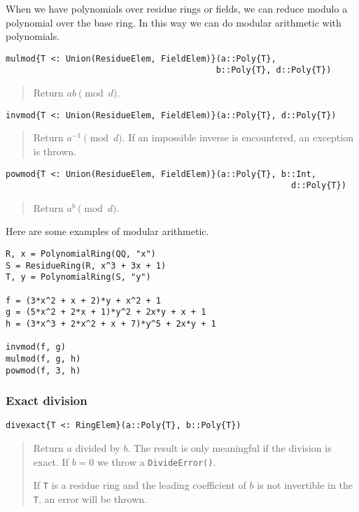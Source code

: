 \documentclass[a4paper,10pt]{article}
\newcommand{\code}{\lstinline}
\newcommand{\desc}[1]{\vspace{-3mm}\begin{quote}#1\end{quote}}
\begin{document}
When we have polynomials over residue rings or fields, we can reduce modulo
a polynomial over the base ring. In this way we can do modular arithmetic with
polynomials.

\begin{lstlisting}
mulmod{T <: Union(ResidueElem, FieldElem)}(a::Poly{T}, 
                                          b::Poly{T}, d::Poly{T})
\end{lstlisting}

\desc{Return $ab \pmod{d}$.}

\begin{lstlisting}
invmod{T <: Union(ResidueElem, FieldElem)}(a::Poly{T}, d::Poly{T})
\end{lstlisting}

\desc{Return $a^{-1} \pmod{d}$. If an impossible inverse is encountered, an
exception is thrown.}

\begin{lstlisting}
powmod{T <: Union(ResidueElem, FieldElem)}(a::Poly{T}, b::Int, 
                                                         d::Poly{T})
\end{lstlisting}

\desc{Return $a^b \pmod{d}$.}

Here are some examples of modular arithmetic.

\begin{lstlisting}
R, x = PolynomialRing(QQ, "x")
S = ResidueRing(R, x^3 + 3x + 1)
T, y = PolynomialRing(S, "y")

f = (3*x^2 + x + 2)*y + x^2 + 1
g = (5*x^2 + 2*x + 1)*y^2 + 2x*y + x + 1
h = (3*x^3 + 2*x^2 + x + 7)*y^5 + 2x*y + 1

invmod(f, g)
mulmod(f, g, h)
powmod(f, 3, h)
\end{lstlisting}

\subsubsection{Exact division}

\begin{lstlisting}
divexact{T <: RingElem}(a::Poly{T}, b::Poly{T})
\end{lstlisting}

\desc{Return $a$ divided by $b$. The result is only meaningful if the division is
exact. If $b = 0$ we throw a \code{DivideError()}. 

If \code{T} is a residue ring and the leading coefficient of $b$ is not invertible
in the \code{T}, an error will be thrown.} 
\end{document}

